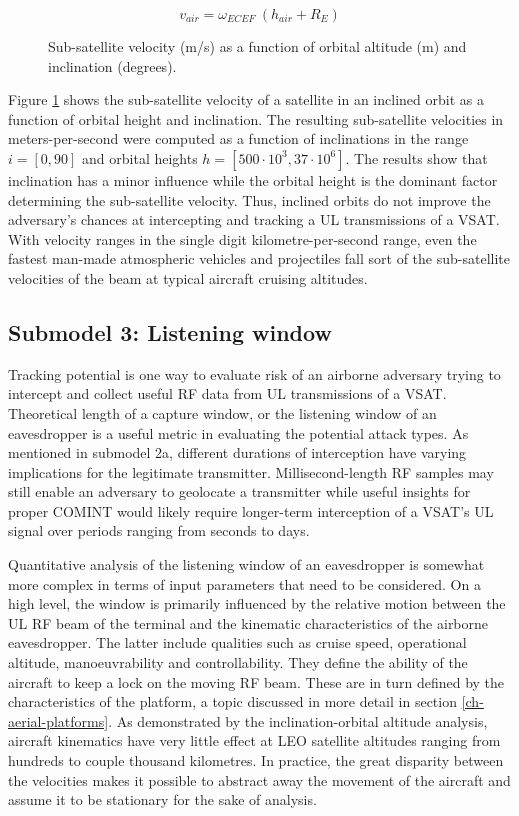 \documentclass[english, 12pt, a4paper, elec, utf8, a-1b, online]{aaltothesis}
\begin{document}
\begin{equation}
  v_{air} = \omega_{ECEF}\ (h_{air} + R_E)
\end{equation}

\begin{figure}[h]
  \centering
  
  \caption{Sub-satellite velocity (m/s) as a function of orbital altitude (m) and inclination (degrees).}
  \label{fig-subsat-velocity-inclined}
\end{figure}
Figure \ref{fig-subsat-velocity-inclined} shows the sub-satellite velocity of a satellite in an inclined orbit as a function of orbital height and inclination.
The resulting sub-satellite velocities in meters-per-second were computed as a function of inclinations in the range $i = [0,90]$ and orbital heights $h = [500 \cdot 10^3, 37 \cdot 10^6]$.
The results show that inclination has a minor influence while the orbital height is the dominant factor determining the sub-satellite velocity.
Thus, inclined orbits do not improve the adversary's chances at intercepting and tracking a UL transmissions of a VSAT.
With velocity ranges in the single digit kilometre-per-second range, even the fastest man-made atmospheric vehicles and projectiles fall sort of the sub-satellite velocities of the beam at typical aircraft cruising altitudes.

\subsection{Submodel 3: Listening window} \label{ch-results-submodel-3-window}
Tracking potential is one way to evaluate risk of an airborne adversary trying to intercept and collect useful RF data from UL transmissions of a VSAT.
Theoretical length of a capture window, or the listening window of an eavesdropper is a useful metric in evaluating the potential attack types.
As mentioned in submodel 2a, different durations of interception have varying implications for the legitimate transmitter.
Millisecond-length RF samples may still enable an adversary to geolocate a transmitter while useful insights for proper COMINT would likely require longer-term interception of a VSAT's UL signal over periods ranging from seconds to days.

Quantitative analysis of the listening window of an eavesdropper is somewhat more complex in terms of input parameters that need to be considered.
On a high level, the window is primarily influenced by the relative motion between the UL RF beam of the terminal and the kinematic characteristics of the airborne eavesdropper.
The latter include qualities such as cruise speed, operational altitude, manoeuvrability and controllability.
They define the ability of the aircraft to keep a lock on the moving RF beam.
These are in turn defined by the characteristics of the platform, a topic discussed in more detail in section \ref{ch-aerial-platforms}.
As demonstrated by the inclination-orbital altitude analysis, aircraft kinematics have very little effect at LEO satellite altitudes ranging from hundreds to couple thousand kilometres.
In practice, the great disparity between the velocities makes it possible to abstract away the movement of the aircraft and assume it to be stationary for the sake of analysis.
\end{document}
